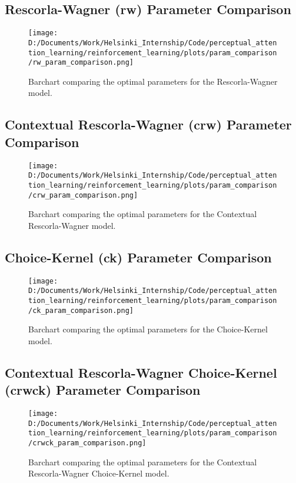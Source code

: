 \documentclass[12pt]{article}
\newcommand{\parameter}{0.35}
\begin{document}
\subsection{Rescorla-Wagner (rw) Parameter Comparison}

\begin{figure}[h]  %
	\centering
	\texttt{[image: D:/Documents/Work/Helsinki\_Internship/Code/perceptual\_attention\_learning/reinforcement\_learning/plots/param\_comparison/rw\_param\_comparison.png]}  %
	\caption{Barchart comparing the optimal parameters for the Rescorla-Wagner model.}
	\label{fig:rw_model_parmeters}
\end{figure}
\clearpage
\newpage
\subsection{Contextual Rescorla-Wagner (crw) Parameter Comparison}

\begin{figure}[h]  %
	\centering
	\texttt{[image: D:/Documents/Work/Helsinki\_Internship/Code/perceptual\_attention\_learning/reinforcement\_learning/plots/param\_comparison/crw\_param\_comparison.png]}  %
	\caption{Barchart comparing the optimal parameters for the Contextual Rescorla-Wagner model.}
	\label{fig:crw_model_parmeters}
\end{figure}  

\clearpage
\newpage
\subsection{Choice-Kernel (ck) Parameter Comparison}

\begin{figure}[h]  %
	\centering
	\texttt{[image: D:/Documents/Work/Helsinki\_Internship/Code/perceptual\_attention\_learning/reinforcement\_learning/plots/param\_comparison/ck\_param\_comparison.png]}  %
	\caption{Barchart comparing the optimal parameters for the Choice-Kernel model.}
	\label{fig:ck_model_parmeters}
\end{figure} 
\clearpage
\newpage
\subsection{Contextual Rescorla-Wagner Choice-Kernel (crwck) Parameter Comparison}
\begin{figure}[h]  %
	\centering
	\texttt{[image: D:/Documents/Work/Helsinki\_Internship/Code/perceptual\_attention\_learning/reinforcement\_learning/plots/param\_comparison/crwck\_param\_comparison.png]}  %
	\caption{Barchart comparing the optimal parameters for the Contextual Rescorla-Wagner Choice-Kernel model.}
	\label{fig:crwck_model_parmeters}
\end{figure} 
\end{document}
